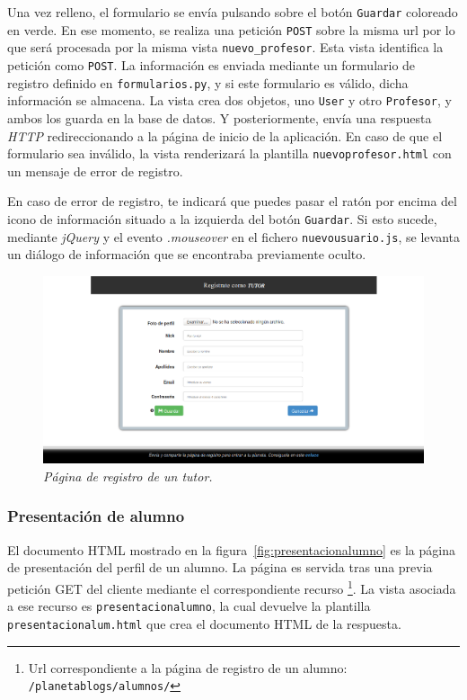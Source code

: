 \documentclass[a4paper, 12pt]{book}
\begin{document}
Una vez relleno, el formulario se env\'ia pulsando sobre el bot\'on \texttt{Guardar} coloreado en verde. En ese momento, se realiza una petici\'on 
\texttt{POST} sobre la misma url por lo que ser\'a procesada por la misma vista \texttt{nuevo\_profesor}. Esta vista identifica la petici\'on como 
\texttt{POST}. La informaci\'on es enviada mediante un formulario de registro definido en \texttt{formularios.py}, y si este formulario es v\'alido, dicha
informaci\'on se almacena. La vista crea dos objetos, uno \texttt{User} y otro \texttt{Profesor}, y ambos los guarda en la base de datos. Y posteriormente, 
env\'ia una respuesta \textit{HTTP} redireccionando a la p\'agina de inicio de la aplicaci\'on. En caso de que el formulario sea inv\'alido, la vista 
renderizar\'a la plantilla \texttt{nuevoprofesor.html} con un mensaje de error de registro.

En caso de error de registro, te indicar\'a que puedes pasar el rat\'on por encima del icono de informaci\'on situado a la izquierda del bot\'on 
\texttt{Guardar}. Si esto sucede, mediante \textit{jQuery} y el evento \textit{.mouseover} en el fichero \texttt{nuevousuario.js}, se levanta un di\'alogo 
de informaci\'on que se encontraba previamente oculto.
\begin{figure}
  \centering
  \includegraphics[width=17cm, keepaspectratio]{imagenes/RegistroTutor}
  \caption{\textit{P\'agina de registro de un tutor.}}
  \label{fig:registrotutor}
\end{figure}


\subsubsection{Presentaci\'on de alumno} 
\label{sec:presentacionalumno}
El documento HTML mostrado en la figura~\ref{fig:presentacionalumno} es la p\'agina de presentaci\'on del perfil de un alumno. La p\'agina es servida 
tras una previa petici\'on GET del cliente mediante el correspondiente recurso \footnote{Url correspondiente a la p\'agina de registro de un alumno: 
\texttt{/planetablogs/alumnos/}}. La vista asociada a ese recurso es \texttt{presentacionalumno}, la cual devuelve la plantilla 
\texttt{presentacionalum.html} que crea el documento HTML de la respuesta.
\end{document}
